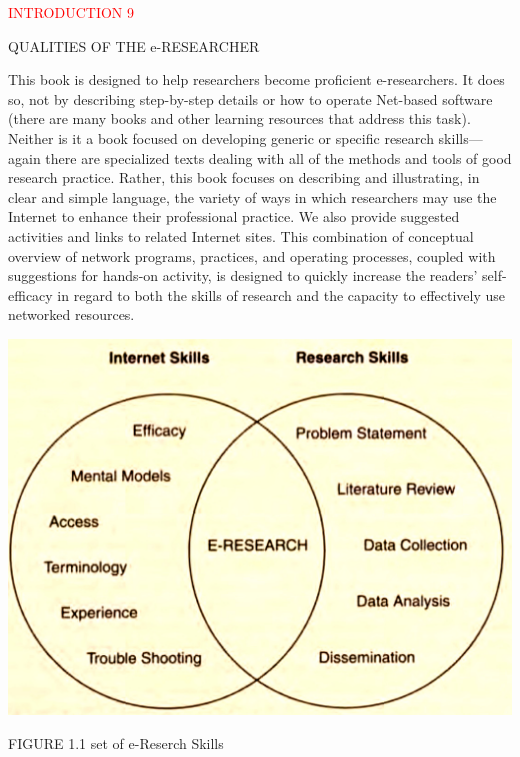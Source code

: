 \documentclass [8pt]{beamer}
\begin{document}
\begin{frame}
	
    \begin{flushleft}
   	\textcolor{red}{INTRODUCTION  9}		 
    \end{flushleft}
   
     \begin{flushleft}
    	QUALITIES OF THE e-RESEARCHER	
     \end{flushleft}
 
     This book is designed to help researchers become proficient e-researchers. It does so, not by describing step-by-step details or how to operate Net-based software (there are many books and other learning resources that address this task). Neither is it a book focused on developing generic or specific research skills—again there are specialized texts dealing with all of the methods and tools of good research practice. Rather, this book focuses on describing and illustrating, in clear and simple language, the variety of ways in which researchers may use the Internet to enhance their professional practice. We also provide suggested activities and links to related Internet sites. This combination of conceptual overview of network programs, practices, and operating processes, coupled with suggestions for hands-on activity, is designed to quickly increase the readers' self-efficacy in regard to both the skills of research and the capacity to effectively use networked resources.
     
     	\begin{center}
     	\includegraphics[scale=0.1]{2m}	
        \end{center}
        FIGURE 1.1 set of e-Reserch Skills	
        	
\end{frame}
\end{document}
